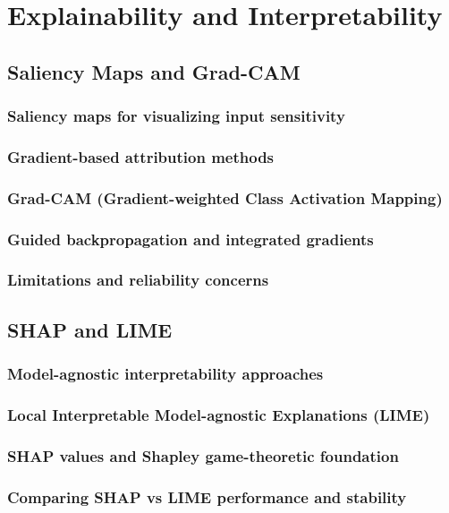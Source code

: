 ﻿\chapter{Explainability and Interpretability}
\section{Saliency Maps and Grad-CAM}
\subsection{Saliency maps for visualizing input sensitivity}
\subsection{Gradient-based attribution methods}
\subsection{Grad-CAM (Gradient-weighted Class Activation Mapping)}
\subsection{Guided backpropagation and integrated gradients}
\subsection{Limitations and reliability concerns}

\section{SHAP and LIME}
\subsection{Model-agnostic interpretability approaches}
\subsection{Local Interpretable Model-agnostic Explanations (LIME)}
\subsection{SHAP values and Shapley game-theoretic foundation}
\subsection{Comparing SHAP vs LIME performance and stability}
